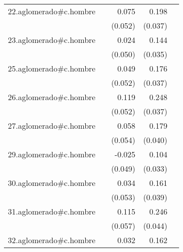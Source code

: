 {\begin{longtable}{l*{4}{D{.}{.}{-1}}}
\addlinespace
22.aglomerado#c.hombre&                     &       0.075         &       0.198\sym{***}&                     \\
            &                     &     (0.052)         &     (0.037)         &                     \\
\addlinespace
23.aglomerado#c.hombre&                     &       0.024         &       0.144\sym{***}&                     \\
            &                     &     (0.050)         &     (0.035)         &                     \\
\addlinespace
25.aglomerado#c.hombre&                     &       0.049         &       0.176\sym{***}&                     \\
            &                     &     (0.052)         &     (0.037)         &                     \\
\addlinespace
26.aglomerado#c.hombre&                     &       0.119\sym{*}  &       0.248\sym{***}&                     \\
            &                     &     (0.052)         &     (0.037)         &                     \\
\addlinespace
27.aglomerado#c.hombre&                     &       0.058         &       0.179\sym{***}&                     \\
            &                     &     (0.054)         &     (0.040)         &                     \\
\addlinespace
29.aglomerado#c.hombre&                     &      -0.025         &       0.104\sym{**} &                     \\
            &                     &     (0.049)         &     (0.033)         &                     \\
\addlinespace
30.aglomerado#c.hombre&                     &       0.034         &       0.161\sym{***}&                     \\
            &                     &     (0.053)         &     (0.039)         &                     \\
\addlinespace
31.aglomerado#c.hombre&                     &       0.115\sym{*}  &       0.246\sym{***}&                     \\
            &                     &     (0.057)         &     (0.044)         &                     \\
\addlinespace
32.aglomerado#c.hombre&                     &       0.032         &       0.162\sym{***}&                     \\

\end{longtable}}
